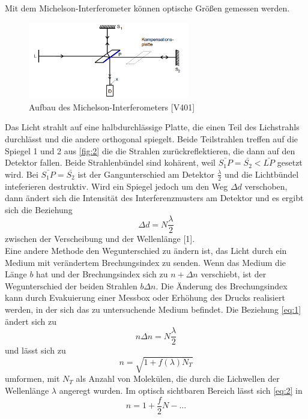 Mit dem Michelson-Interferometer können optische Größen gemessen werden. 
\begin{figure}[H]
  \centering
  \includegraphics[width=7cm]{2}
  \caption{Aufbau des Michelson-Interferometers [V401]}
  \label{fig:2}
\end{figure}
Das Licht strahlt auf eine halbdurchlässige Platte, die einen Teil des Lichstrahls durchlässt und die andere orthogonal spiegelt. Beide Teilstrahlen treffen auf die Spiegel 1 und 2 aus \autoref{fig:2} die die Strahlen zurückreflektieren, die dann auf den Detektor fallen. Beide Strahlenbündel sind kohärent, weil $\bar{S_{1}P}=\bar{S_{2}}<\bar{LP}$ gesetzt wird. Bei $\bar{S_{1}P}=\bar{S_{2}}$ ist der Gangunterschied am Detektor $\frac{\lambda}{2}$ und die Lichtbündel inteferieren destruktiv. Wird ein Spiegel jedoch um den Weg $\Delta d$ verschoben, dann ändert sich die Intensität des Interferenzmusters am Detektor und es ergibt sich die Beziehung
\begin{equation}
  \Delta d=N\frac{\lambda}{2}
  \label{eq:1}
\end{equation}
zwischen der Verscheibung und der Wellenlänge [1].\\
Eine andere Methode den Wegunterschied zu ändern ist, das Licht durch ein Medium mit verändertem Brechungsindex zu senden. Wenn das Medium die Länge $b$ hat und der Brechungsindex sich zu $n+\Delta n$ verschiebt, ist der Wegunterschied der beiden Strahlen $b\Delta n$. Die Änderung des Brechungsindex kann durch Evakuierung einer Messbox oder Erhöhung des Drucks realisiert werden, in der sich das zu untersuchende Medium befindet. Die Beziehung \eqref{eq:1} ändert sich zu
\begin{equation}
  n\Delta n =N\frac{\lambda}{2} \nonumber
\end{equation}
und lässt sich zu 
\begin{equation}
  n=\sqrt{1+f(\lambda)N_{T}}
  \label{eq:2}
\end{equation}
umformen, mit $N_{T}$ als Anzahl von Molekülen, die durch die Lichwellen der Wellenlänge $\lambda$ angeregt wurden. Im optisch sichtbaren Bereich lässt sich \eqref{eq:2} in
\begin{equation}
  n=1+\frac{f}{2}N-... \nonumber
\end{equation}
